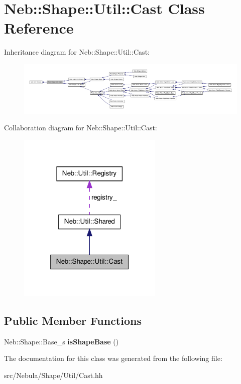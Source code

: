 \hypertarget{classNeb_1_1Shape_1_1Util_1_1Cast}{\section{\-Neb\-:\-:\-Shape\-:\-:\-Util\-:\-:\-Cast \-Class \-Reference}
\label{classNeb_1_1Shape_1_1Util_1_1Cast}
}


\-Inheritance diagram for \-Neb\-:\-:\-Shape\-:\-:\-Util\-:\-:\-Cast\-:\nopagebreak
\begin{figure}[H]
\begin{center}
\leavevmode
\includegraphics[width=350pt]{classNeb_1_1Shape_1_1Util_1_1Cast__inherit__graph}
\end{center}
\end{figure}


\-Collaboration diagram for \-Neb\-:\-:\-Shape\-:\-:\-Util\-:\-:\-Cast\-:\nopagebreak
\begin{figure}[H]
\begin{center}
\leavevmode
\includegraphics[width=196pt]{classNeb_1_1Shape_1_1Util_1_1Cast__coll__graph}
\end{center}
\end{figure}
\subsection*{\-Public \-Member \-Functions}
\begin{DoxyCompactItemize}
\item 
\hypertarget{classNeb_1_1Shape_1_1Util_1_1Cast_ae0f12f8f3b4bf6cf15b697249208a087}{\-Neb\-::\-Shape\-::\-Base\-\_\-s {\bfseries is\-Shape\-Base} ()}\label{classNeb_1_1Shape_1_1Util_1_1Cast_ae0f12f8f3b4bf6cf15b697249208a087}

\end{DoxyCompactItemize}


\-The documentation for this class was generated from the following file\-:\begin{DoxyCompactItemize}
\item 
src/\-Nebula/\-Shape/\-Util/\-Cast.\-hh\end{DoxyCompactItemize}
